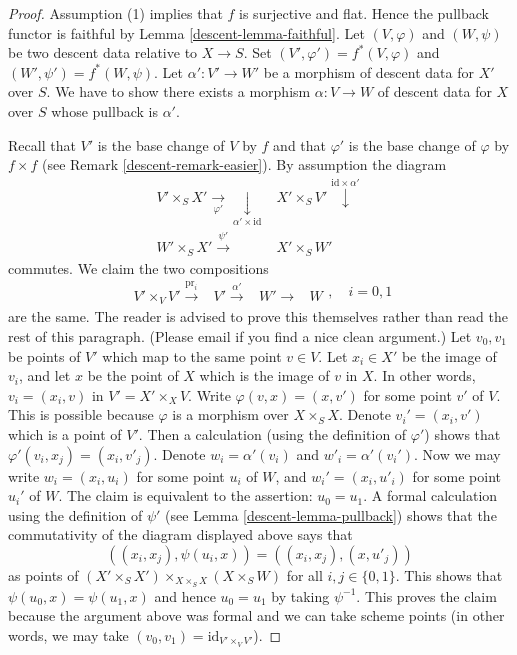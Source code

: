 \begin{proof}

Assumption (1) implies that $f$ is surjective and flat.
Hence the pullback functor is faithful by
Lemma \ref{descent-lemma-faithful}.
Let $(V, \varphi)$ and $(W, \psi)$ be two descent data relative
to $X \to S$. Set $(V', \varphi') = f^*(V, \varphi)$ and
$(W', \psi') = f^*(W, \psi)$.
Let $\alpha' : V' \to W'$ be a morphism of descent data for $X'$ over $S$.
We have to show there exists a morphism $\alpha : V \to W$ of
descent data for $X$ over $S$ whose pullback is $\alpha'$.

\medskip\noindent
Recall that $V'$ is the base change of $V$ by $f$ and that
$\varphi'$ is the base change of $\varphi$ by $f \times f$
(see Remark \ref{descent-remark-easier}).
By assumption the diagram
$$
\begin{array}{cc}V' \times_S X' \underset{\varphi'}{\longrightarrow}\underset{\alpha' \times \text{id}}{\downarrow} & X' \times_S V' \overset{\text{id} \times \alpha'}{\downarrow} \\ W' \times_S X' \overset{\psi'}{\longrightarrow} & X' \times_S W'\end{array}
$$
commutes. We claim the two compositions
$$
\begin{array}{cccc}V' \times_V V' \overset{\text{pr}_i}{\longrightarrow} & V' \overset{\alpha'}{\longrightarrow} & W' \longrightarrow & W\end{array}
, \quad i = 0, 1
$$
are the same. The reader is advised to prove this themselves rather
than read the rest of this paragraph. (Please email if you find a
nice clean argument.)
Let $v_0, v_1$ be points of $V'$ which map to the same point $v \in V$.
Let $x_i \in X'$ be the image of $v_i$, and let
$x$ be the point of $X$ which is the image of $v$ in $X$. In other words,
$v_i = (x_i, v)$ in $V' = X' \times_X V$. Write
$\varphi(v, x) = (x, v')$ for some point $v'$ of $V$.
This is possible because $\varphi$ is
a morphism over $X \times_S X$. Denote
$v_i' = (x_i, v')$ which is a point of $V'$.
Then a calculation (using the definition of $\varphi'$)
shows that $\varphi'(v_i, x_j) = (x_i, v'_j)$. Denote
$w_i = \alpha'(v_i)$ and $w'_i = \alpha'(v_i')$.
Now we may write $w_i = (x_i, u_i)$ for some point $u_i$ of $W$,
and $w_i' = (x_i, u'_i)$ for some point $u_i'$ of $W$.
The claim is equivalent to the assertion: $u_0 = u_1$.
A formal calculation using the definition of $\psi'$
(see Lemma \ref{descent-lemma-pullback}) shows
that the commutativity of the diagram displayed above says that
$$
((x_i, x_j), \psi(u_i, x)) = ((x_i, x_j), (x, u'_j))
$$
as points of
$(X' \times_S X') \times_{X \times_S X} (X \times_S W)$
for all $i, j \in \{0, 1\}$. This shows that $\psi(u_0, x) = \psi(u_1, x)$
and hence $u_0 = u_1$ by taking $\psi^{-1}$.
This proves the claim because the argument above was formal
and we can take scheme points (in other words, we may
take $(v_0, v_1) = \text{id}_{V' \times_V V'}$).


\end{proof}
